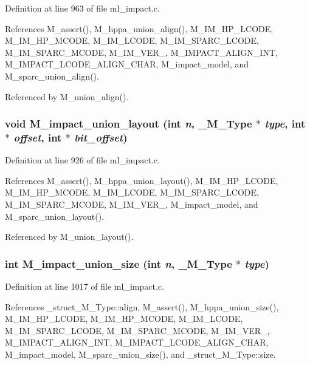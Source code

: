 Definition at line 963 of file ml\_\-impact.c.

References M\_\-assert(), M\_\-hppa\_\-union\_\-align(), M\_\-IM\_\-HP\_\-LCODE, M\_\-IM\_\-HP\_\-MCODE, M\_\-IM\_\-LCODE, M\_\-IM\_\-SPARC\_\-LCODE, M\_\-IM\_\-SPARC\_\-MCODE, M\_\-IM\_\-VER\_, M\_\-IMPACT\_\-ALIGN\_\-INT, M\_\-IMPACT\_\-LCODE\_\-ALIGN\_\-CHAR, M\_\-impact\_\-model, and M\_\-sparc\_\-union\_\-align().

Referenced by M\_\-union\_\-align().
\subsubsection{\setlength{\rightskip}{0pt plus 5cm}void M\_\-impact\_\-union\_\-layout (int {\em n}, \bf{\_\-M\_\-Type} $\ast$ {\em type}, int $\ast$ {\em offset}, int $\ast$ {\em bit\_\-offset})}\label{ml__impact_8c_44a1330a8c7bc6a524a8499491e659fa}




Definition at line 926 of file ml\_\-impact.c.

References M\_\-assert(), M\_\-hppa\_\-union\_\-layout(), M\_\-IM\_\-HP\_\-LCODE, M\_\-IM\_\-HP\_\-MCODE, M\_\-IM\_\-LCODE, M\_\-IM\_\-SPARC\_\-LCODE, M\_\-IM\_\-SPARC\_\-MCODE, M\_\-IM\_\-VER\_, M\_\-impact\_\-model, and M\_\-sparc\_\-union\_\-layout().

Referenced by M\_\-union\_\-layout().
\subsubsection{\setlength{\rightskip}{0pt plus 5cm}int M\_\-impact\_\-union\_\-size (int {\em n}, \bf{\_\-M\_\-Type} $\ast$ {\em type})}\label{ml__impact_8c_60162eb6fcc852b1e553033653d6e5a4}




Definition at line 1017 of file ml\_\-impact.c.

References \_\-struct\_\-M\_\-Type::align, M\_\-assert(), M\_\-hppa\_\-union\_\-size(), M\_\-IM\_\-HP\_\-LCODE, M\_\-IM\_\-HP\_\-MCODE, M\_\-IM\_\-LCODE, M\_\-IM\_\-SPARC\_\-LCODE, M\_\-IM\_\-SPARC\_\-MCODE, M\_\-IM\_\-VER\_, M\_\-IMPACT\_\-ALIGN\_\-INT, M\_\-IMPACT\_\-LCODE\_\-ALIGN\_\-CHAR, M\_\-impact\_\-model, M\_\-sparc\_\-union\_\-size(), and \_\-struct\_\-M\_\-Type::size.

